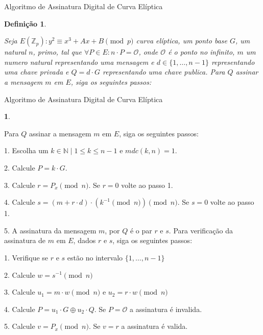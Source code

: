 \documentclass[brazil]{beamer}
\newtheorem{definicao}{Definição}\theoremstyle{definition}
\newtheorem{continuacao}{}\theoremstyle{definition}
\newcommand{\N}{\mathbb{N}}
\newcommand{\Z}{\mathbb{Z}}
\begin{document}
\begin{frame}{Algoritmo de Assinatura Digital de Curva Elíptica}

\begin{definicao} \label{definicao:68f23b4d-0cae-44d3-8489-a171e2297efa}
	
	Seja $E(\Z_{p}): y^2 \equiv x^3 + Ax + B \pmod{p}$ curva elíptica, um ponto
	base $G$, um natural $n$, primo, tal que $\forall P \in E: n \cdot P =
	\mathcal{O}$, onde $\mathcal{O}$ é o ponto no infinito, $m$ um numero natural
	representando uma mensagem e $d \in \{1, \ldots, n - 1\}$ representando uma
	chave privada e $Q = d \cdot G$ representando uma chave publica. \justify Para
	$Q$ assinar a mensagem $m$ em $E$, siga os seguintes passos:
 
\end{definicao}
\end{frame}
\begin{frame}{Algoritmo de Assinatura Digital de Curva Elíptica}
	
	\begin{continuacao} \label{definicao:68f23b4d-0cae-44d3-8489-a171e2297efa}
		
	  Para
		$Q$ assinar a mensagem $m$ em $E$, siga os seguintes passos:
		
		1. Escolha um $k \in \N \mid 1 \leq k \leq n - 1 \text{ e } mdc(k, n) = 1$.
		
		2. Calcule $P = k \cdot  G$.
		
		3. Calcule $r = P_x \pmod{n}$. Se $r = 0$ volte ao passo 1.
		
		4. Calcule $s = (m + r \cdot d) \cdot (k^{-1} \pmod{n}) \pmod{n}$. Se $s = 0$ volte ao passo 1.
		
		5. A assinatura da mensagem $m$, por $Q$ é o par $r$ e $s$.
		\justify
		Para verificação da assinatura de $m$ em $E$, dados $r$ e $s$, siga os seguintes passos:
		
		1. Verifique se $r$ e $s$ estão no intervalo $\{1, \ldots, n - 1\}$
		
		2. Calcule $w = s^{-1} \pmod{n}$
		
		3. Calcule $u_1 = m \cdot w \pmod{n}$ e $u_2 = r \cdot w \pmod{n}$
		
		4. Calcule $P = u_1 \cdot G \oplus u_2 \cdot Q$. Se $P = \mathcal{O}$ a assinatura é invalida.
		
		5. Calcule $v = P_x \pmod{n}$. Se $v = r$ a assinatura é valida.
	\end{continuacao}
\end{frame}
\end{document}
